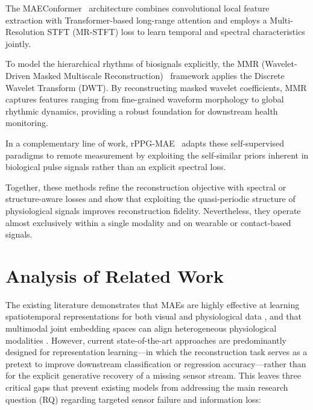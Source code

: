 The MAEConformer~\cite{yu2026maeconformer} architecture combines convolutional
local feature extraction with Transformer-based long-range attention and employs
a Multi-Resolution STFT (MR-STFT) loss to learn temporal and spectral
characteristics jointly. 

To model the hierarchical rhythms of biosignals explicitly, the MMR (Wavelet-Driven Masked Multiscale
Reconstruction)~\cite{thukral2026wavelet} framework applies the Discrete Wavelet Transform (DWT).
By reconstructing masked wavelet coefficients, MMR captures features ranging from
fine-grained waveform morphology to global rhythmic dynamics, providing a robust
foundation for downstream health monitoring.

In a complementary line of work, rPPG-MAE~\cite{liu2023rppgmae} adapts these self-supervised paradigms
to remote measurement by exploiting the self-similar priors inherent in
biological pulse signals rather than an explicit spectral loss.

Together, these methods refine the reconstruction objective with spectral or
structure-aware losses and show that exploiting the quasi-periodic structure of
physiological signals improves reconstruction fidelity. Nevertheless, they
operate almost exclusively within a single modality and on wearable or
contact-based signals. 


\section{Analysis of Related Work}
\label{sec:rw-analysis}
The existing literature demonstrates that MAEs are highly effective at learning
spatiotemporal representations for both visual \cite{tong2022videomae,
wang2023videomaev2} and physiological data \cite{liu2023rppgmae, savic2024physunet},
and that multimodal joint embedding spaces can align heterogeneous physiological
modalities \cite{bachmann2022multimae, girdhar2023imagebind, zhou2026xmae}.
However, current state-of-the-art approaches are predominantly designed for
representation learning---in which the reconstruction task serves as a pretext
to improve downstream classification or regression accuracy---rather than for
the explicit generative recovery of a missing sensor stream. This leaves three
critical gaps that prevent existing models from addressing the main research
question (RQ) regarding targeted sensor failure and information loss:

